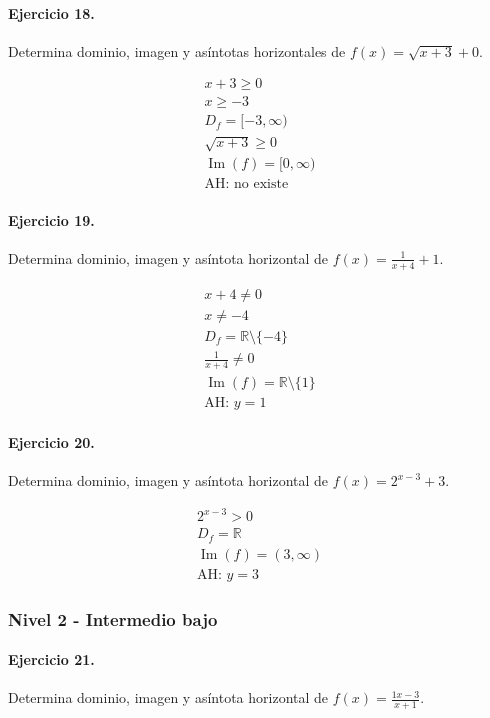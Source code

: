 \documentclass[11pt,a4paper]{article}
\begin{document}
\paragraph{Ejercicio 18.} Determina dominio, imagen y asíntotas horizontales de $f(x)=\sqrt{x+3}+0$.

\[
\begin{aligned}
x+3\ge0\\
x\ge -3\\
D_f=[-3,\infty)\\
\sqrt{x+3}\ge0\\
\operatorname{Im}(f)=[0,\infty)\\
\text{{AH: no existe}}
\end{aligned}
\]


\paragraph{Ejercicio 19.} Determina dominio, imagen y asíntota horizontal de $f(x)=\frac{1}{x+4}+1$.

\[
\begin{aligned}
x+4\ne0\\
x\ne -4\\
D_f=\mathbb{R}\setminus\{-4\}\\
\frac{1}{x+4}\ne0\\
\operatorname{Im}(f)=\mathbb{R}\setminus\{1\}\\
\text{AH: }y=1
\end{aligned}
\]


\paragraph{Ejercicio 20.} Determina dominio, imagen y asíntota horizontal de $f(x)=2^{x-3}+3$.

\[
\begin{aligned}
2^{x-3}>0\\
D_f=\mathbb{R}\\
\operatorname{Im}(f)=(3,\infty)\\
\text{AH: }y=3
\end{aligned}
\]


\newpage

\subsubsection*{Nivel 2 - Intermedio bajo}

\paragraph{Ejercicio 21.} Determina dominio, imagen y asíntota horizontal de $f(x)=\frac{1x-3}{x+1}$.
\end{document}
